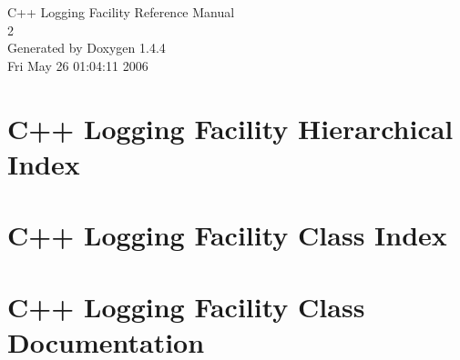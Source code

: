 \documentclass[a4paper]{book}
\begin{document}
\begin{titlepage}
\vspace*{7cm}
\begin{center}
{\Large C++ Logging Facility Reference Manual\\[1ex]\large 2 }\\
\vspace*{1cm}
{\large Generated by Doxygen 1.4.4}\\
\vspace*{0.5cm}
{\small Fri May 26 01:04:11 2006}\\
\end{center}
\end{titlepage}
\clearemptydoublepage
{}
\tableofcontents
\clearemptydoublepage
{}
\chapter{C++ Logging Facility Hierarchical Index}

\chapter{C++ Logging Facility Class Index}

\chapter{C++ Logging Facility Class Documentation}








\printindex
\end{document}
